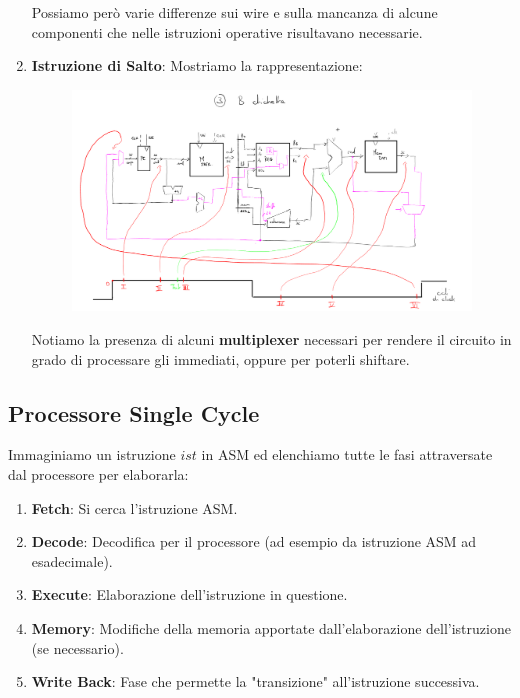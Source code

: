 \documentclass{article}
\begin{document}
\begin{enumerate}
Possiamo però varie differenze sui wire e sulla mancanza di alcune componenti che nelle istruzioni operative risultavano necessarie.

\vspace*{20px}

\item \textbf{Istruzione di Salto}: Mostriamo la rappresentazione: 

    \begin{figure}[htbp]
        \center
        \includegraphics[scale=0.23]{img/reteSalto.png}
    \end{figure}

Notiamo la presenza di alcuni \textbf{multiplexer} necessari per rendere il circuito in grado di processare gli immediati, oppure per poterli shiftare.
    
\end{enumerate}

\newpage

\subsection{Processore Single Cycle}

Immaginiamo un istruzione $ist$ in ASM ed elenchiamo tutte le fasi attraversate dal processore per elaborarla:

\begin{enumerate}
    \item \textbf{Fetch}: Si cerca l'istruzione ASM.
    \item \textbf{Decode}: Decodifica per il processore (ad esempio da istruzione ASM ad esadecimale).
    \item \textbf{Execute}: Elaborazione dell'istruzione in questione.
    \item \textbf{Memory}: Modifiche della memoria apportate dall'elaborazione dell'istruzione (se necessario).
    \item \textbf{Write Back}: Fase che permette la "transizione" all'istruzione successiva.
\end{enumerate}
\end{document}

